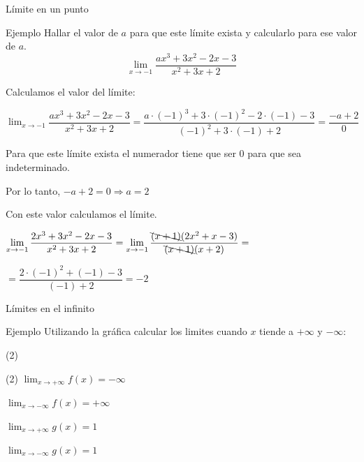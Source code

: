 \documentclass[8pt]{beamer}
\newcommand{\limite}[2]{\displaystyle \lim_{x \rightarrow #1}{#2}}
\begin{document}
\begin{frame}{Límite en un punto}
\begin{exampleblock}{Ejemplo}
Hallar el valor de $a$ para que este límite exista y calcularlo para ese valor de $a$.
\[ \limite{-1}{\dfrac{ax^3+3x^2-2x-3}{x^2+3x+2}} \]
\end{exampleblock}

Calculamos el valor del límite:

$\limite{-1}{\dfrac{ax^3+3x^2-2x-3}{x^2+3x+2}}= \dfrac{a\cdot (-1)^3+3\cdot (-1)^2-2\cdot (-1)-3}{(-1)^2+3\cdot (-1)+2}=\dfrac{-a+2}{0} $

Para que este límite exista el numerador tiene que ser $0$ para que sea indeterminado.

Por lo tanto, $-a+2=0 \Rightarrow a= 2$

Con este valor calculamos el límite.

$\limite{-1}{\dfrac{2x^3+3x^2-2x-3}{x^2+3x+2}}= \limite{-1}{\dfrac{\bcancel{(x+1)}(2x^2+x-3)}{\bcancel{(x+1)}(x+2)}}=$

\vspace{10pt}
$=\dfrac{2\cdot(-1)^2+(-1)-3}{(-1)+2}= -2$


\end{frame}

\begin{frame}{Límites en el infinito}
\begin{exampleblock}{Ejemplo}
Utilizando la gráfica calcular los limites cuando $x$ tiende a $+\infty$ y $-\infty$:
 \begin{tasks}[label=\alph*)](2)
\task 

\task

\end{tasks}
\end{exampleblock}

\begin{tasks}[label=\alph*)](2)
\task $\limite{+\infty}{f(x)}=-\infty$

$\limite{-\infty}{f(x)}=+\infty$

\task $\limite{+\infty}{g(x)}=1$

$\limite{-\infty}{g(x)}=1$

\end{tasks}
\end{frame}
\end{document}
